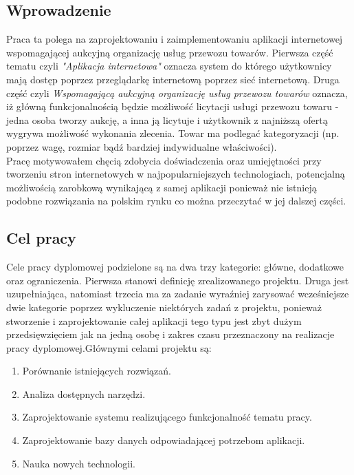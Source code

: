 \documentclass[10pt,titlepage]{article} %
\begin{document}
\subsection{Wprowadzenie}
Praca ta polega na zaprojektowaniu i zaimplementowaniu aplikacji internetowej wspomagającej aukcyjną organizację usług przewozu towarów.
Pierwsza część tematu czyli \textit{"Aplikacja internetowa"} oznacza system do którego użytkownicy mają dostęp poprzez przeglądarkę internetową poprzez sieć internetową. Druga część czyli \textit{Wspomagającą aukcyjną organizację usług przewozu towarów} oznacza, iż   główną funkcjonalnością będzie możliwość licytacji usługi przewozu towaru - jedna osoba tworzy aukcję, a inna ją licytuje i użytkownik z najniższą ofertą wygrywa możliwość wykonania zlecenia. Towar ma podlegać kategoryzacji (np. poprzez wagę, rozmiar bądź bardziej indywidualne właściwości). \mbox{}\\
Pracę motywowałem chęcią zdobycia doświadczenia oraz umiejętności przy tworzeniu stron internetowych w najpopularniejszych technologiach, potencjalną możliwością zarobkową wynikającą z samej aplikacji ponieważ nie istnieją podobne rozwiązania na polskim rynku co można przeczytać w jej dalszej części.
\subsection{Cel pracy}
Cele pracy dyplomowej podzielone są na dwa trzy kategorie: główne, dodatkowe oraz ograniczenia. Pierwsza stanowi definicję zrealizowanego projektu. Druga jest uzupełniająca, natomiast trzecia ma za zadanie wyraźniej zarysować wcześniejsze dwie kategorie poprzez wykluczenie niektórych zadań z projektu, ponieważ stworzenie i zaprojektowanie całej aplikacji tego typu jest zbyt dużym przedsięwzięciem jak na jedną osobę i zakres czasu przeznaczony na realizacje pracy dyplomowej.\mbox\\
 
Głównymi celami projektu są:
\begin{enumerate}[1.]
\item Porównanie istniejących rozwiązań.
\item Analiza dostępnych narzędzi.
\item Zaprojektowanie systemu realizującego funkcjonalność tematu pracy.
\item Zaprojektowanie bazy danych odpowiadającej potrzebom aplikacji.
\item Nauka nowych technologii.
\end{enumerate}
\end{document}
